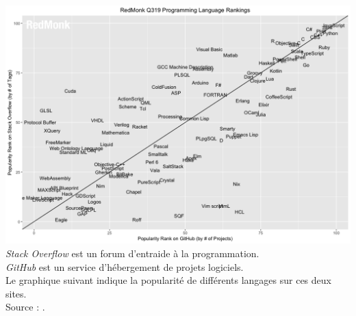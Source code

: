 \documentclass[a4paper,12pt,french]{book}
\begin{document}
\begin{center}
	\includegraphics[width=17cm]{rank.png}\\ \scriptsize	\textit{Stack Overflow} est un forum d'entraide à la programmation.\\ \textit{GitHub} est un service d'hébergement de projets logiciels.\\
	Le graphique suivant indique la popularité de différents langages sur ces deux sites.\\
	Source : .
\end{center}
\end{document}
